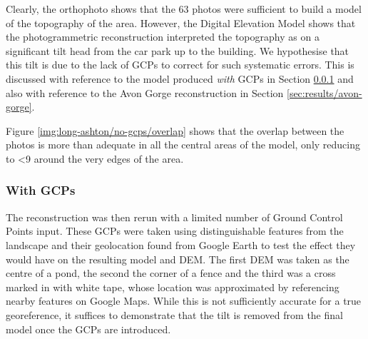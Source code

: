Clearly, the orthophoto shows that the 63 photos were sufficient to build a
model of the topography of the area. However, the Digital Elevation Model shows
that the photogrammetric reconstruction interpreted the topography as on a
significant tilt head from the car park up to the building. We hypothesise that
this tilt is due to the lack of GCPs to correct for such systematic errors. This
is discussed with reference to the model produced \textit{with} GCPs in Section
\ref{sec:results/long-ashton/wth-gcps} and also with reference to the Avon Gorge
reconstruction in Section \ref{sec:results/avon-gorge}.

Figure \ref{img:long-ashton/no-gcps/overlap} shows that the overlap between the
photos is more than adequate in all the central areas of the model, only
reducing to \textless 9 around the very edges of the area.

\subsubsection{With GCPs}
\label{sec:results/long-ashton/wth-gcps}

The reconstruction was then rerun with a limited number of Ground Control Points
input. These GCPs were taken using distinguishable features from the landscape
and their geolocation found from Google Earth to test the effect they would have
on the resulting model and DEM. The first DEM was taken as the centre of a pond,
the second the corner of a fence and the third was a cross marked in with white
tape, whose location was approximated by referencing nearby features on Google
Maps. While this is not sufficiently accurate for a true georeference, it
suffices to demonstrate that the tilt is removed from the final model once the
GCPs are introduced.

